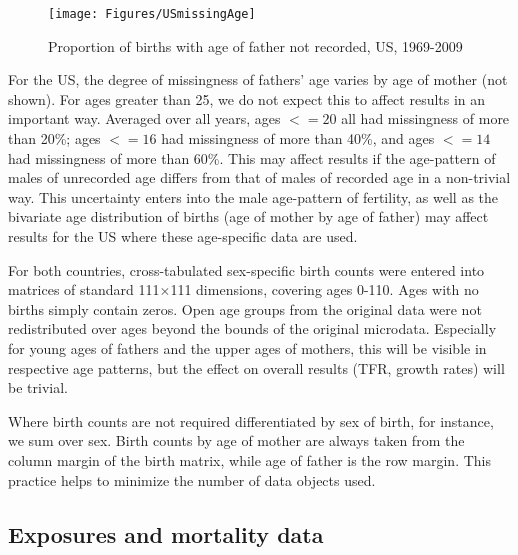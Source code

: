 \begin{figure}[ht!]
        \centering  
          \caption{Proportion of births with age of father not recorded, US,
          1969-2009}
           \texttt{[image: Figures/USmissingAge]}
          \label{fig:USmissingAge}
\end{figure}

For the US, the degree of missingness of fathers' age varies by age of
mother (not shown). For ages greater than 25, we do not expect this to affect
results in an important way. Averaged over all years, ages $<= 20$ all had missingness of more than
20\%; ages $<= 16$ had missingness of more than 40\%, and ages $<= 14$ had
missingness of more than 60\%. This may affect results if the age-pattern of
males of unrecorded age differs from that of males of recorded age in a
non-trivial way. This uncertainty enters into the male
age-pattern of fertility, as well as the bivariate
age distribution of births (age of mother by age of father) may affect results
for the US where these age-specific data are used.

For both countries, cross-tabulated
sex-specific birth counts were entered into matrices of standard 111$\times$111
dimensions, covering ages 0-110. Ages with no births simply contain zeros. Open
age groups from the original data were not redistributed over ages beyond the
bounds of the original microdata. Especially for young ages of fathers and the
upper ages of mothers, this will be visible in respective age
patterns, but the effect on overall results (TFR, growth rates) will be
trivial.

Where birth counts are not required differentiated by sex of birth, for
instance, we sum over sex. Birth counts by age of mother are always taken from
the column margin of the birth matrix, while age of father is the row margin.
This practice helps to minimize the number of data objects used.

\subsection{Exposures and mortality data}

